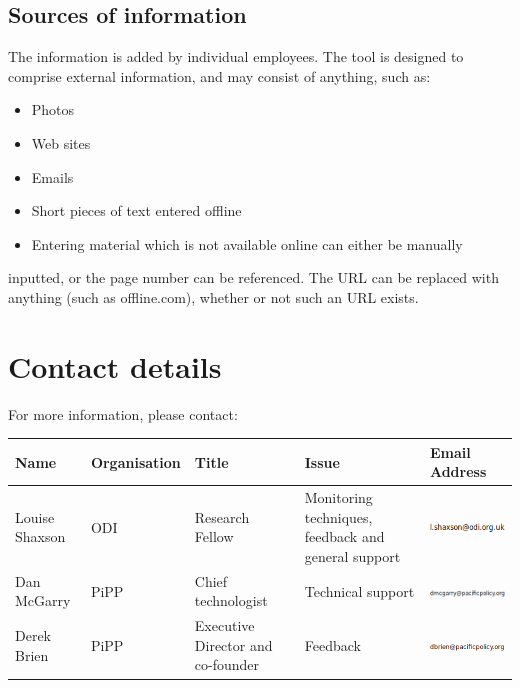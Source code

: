 \documentclass[letterpaper,10pt,english]{sphinxmanual}
\begin{document}
\subsection{Sources of information}
\label{user-guide:sources-of-information}
The information is added by individual employees. The tool is designed
to comprise external information, and may consist of anything, such
as:
\begin{itemize}
\item {} 
Photos

\item {} 
Web sites

\item {} 
Emails

\item {} 
Short pieces of text entered offline

\item {} 
Entering material which is not available online can either be manually

\end{itemize}

inputted, or the page number can be referenced. The URL can be
replaced with anything (such as offline.com), whether or not such an
URL exists.


\section{Contact details}
\label{user-guide:contact-details}
For more information, please contact:

\begin{tabulary}{\linewidth}{|L|L|L|L|L|}
\hline
\textsf{\relax 
Name
} & \textsf{\relax 
Organisation
} & \textsf{\relax 
Title
} & \textsf{\relax 
Issue
} & \textsf{\relax 
Email Address
}\\
\hline
Louise Shaxson
 & 
ODI
 & 
Research Fellow
 & 
Monitoring techniques, feedback and general support
 & 
\includegraphics{louise-email.png}
\\

Dan McGarry
 & 
PiPP
 & 
Chief technologist
 & 
Technical support
 & 
\includegraphics{dan-email.png}
\\

Derek Brien
 & 
PiPP
 & 
Executive Director and co-founder
 & 
Feedback
 & 
\includegraphics{derek-email.png}
\\
\hline\end{tabulary}
\end{document}
